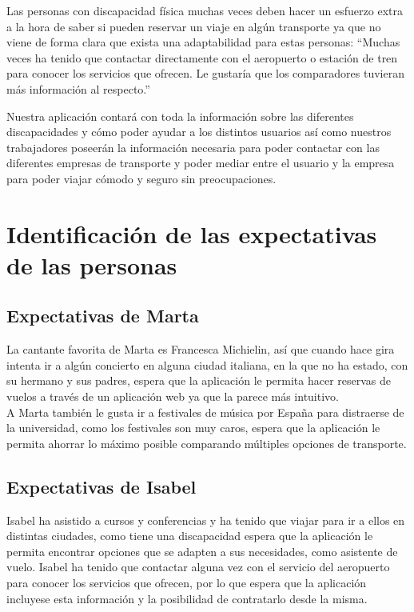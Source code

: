     \begin{problema}

    Las personas con discapacidad física muchas veces deben hacer un esfuerzo extra a la hora de saber si pueden reservar un viaje en algún transporte ya que no viene de forma clara que exista una adaptabilidad para estas personas: ``Muchas veces ha tenido que contactar directamente con el aeropuerto o estación de tren para conocer los servicios que ofrecen. Le gustaría que los comparadores tuvieran más información al respecto.''

    {\centering\begin{vision}
    Nuestra aplicación contará con toda la información sobre las diferentes discapacidades y cómo poder ayudar a los distintos usuarios así como nuestros trabajadores poseerán la información necesaria para poder contactar con las diferentes empresas de transporte y poder mediar entre el usuario y la empresa para poder viajar cómodo y seguro sin preocupaciones.
    \end{vision}}
\end{problema}

\section{Identificación de las expectativas de las personas}
\subsection{Expectativas de Marta}
La cantante favorita de Marta es Francesca Michielin, así que cuando hace gira intenta ir a algún concierto en alguna ciudad italiana, en la que no ha estado, 
con su hermano y sus padres, espera que la aplicación le permita hacer reservas de vuelos a través de un aplicación web ya que la parece más intuitivo. \\

A Marta también le gusta ir a festivales de música por España para distraerse de la universidad, como los festivales son muy caros, espera que la aplicación 
le permita ahorrar lo máximo posible comparando múltiples opciones de transporte.

\subsection{Expectativas de Isabel}
Isabel ha asistido a cursos y conferencias y ha tenido que viajar para ir a ellos en distintas ciudades, como tiene una discapacidad espera que la aplicación 
le permita encontrar opciones que se adapten a sus necesidades, como asistente de vuelo. Isabel ha tenido que contactar alguna vez con el servicio del aeropuerto 
para conocer los servicios que ofrecen, por lo que espera que la aplicación incluyese esta información y la posibilidad de contratarlo desde la misma.

